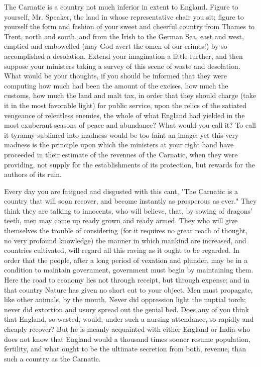 The Carnatic is a country not much inferior in extent to England. Figure to yourself, Mr. Speaker, the land in whose representative chair you sit; figure to yourself the form and fashion of your sweet and cheerful country from Thames to Trent, north and south, and from the Irish to the German Sea, east and west, emptied and embowelled (may God avert the omen of our crimes!) by so accomplished a desolation. Extend your imagination a little further, and then suppose your ministers taking a survey of this scene of waste and desolation. What would be your thoughts, if you should be informed that they were computing how much had been the amount of the excises, how much the customs, how much the land and malt tax, in order that they should charge (take it in the most favorable light) for public service, upon the relics of the satiated vengeance of relentless enemies, the whole of what England had yielded in the most exuberant seasons of peace and abundance? What would you call it? To call it tyranny sublimed into madness would be too faint an image; yet this very madness is the principle upon which the ministers at your right hand have proceeded in their estimate of the revenues of the Carnatic, when they were providing, not supply for the establishments of its protection, but rewards for the authors of its ruin.

Every day you are fatigued and disgusted with this cant, "The Carnatic is a country that will soon recover, and become instantly as prosperous as ever." They think they are talking to innocents, who will believe, that, by sowing of dragons' teeth, men may come up ready grown and ready armed. They who will give themselves the trouble of considering (for it requires no great reach of thought, no very profound knowledge) the manner in which mankind are increased, and countries cultivated, will regard all this raving as it ought to be regarded. In order that the people, after a long period of vexation and plunder, may be in a condition to maintain government, government must begin by maintaining them. Here the road to economy lies not through receipt, but through expense; and in that country Nature has given no short cut to your object. Men must propagate, like other animals, by the mouth. Never did oppression light the nuptial torch; never did extortion and usury spread out the genial bed. Does any of you think that England, so wasted, would, under such a nursing attendance, so rapidly and cheaply recover? But he is meanly acquainted with either England or India who does not know that England would a thousand times sooner resume population, fertility, and what ought to be the ultimate secretion from both, revenue, than such a country as the Carnatic.

